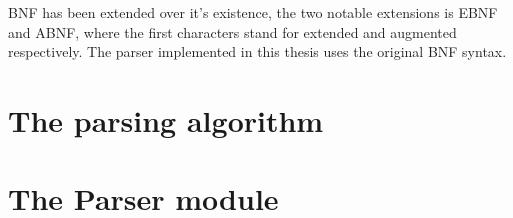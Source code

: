 BNF has been extended over it's existence, the two notable extensions is EBNF and ABNF, where the first characters stand for extended and augmented respectively. The parser implemented in this thesis uses the original BNF syntax.
\section{The parsing algorithm}

\section{The Parser module}



